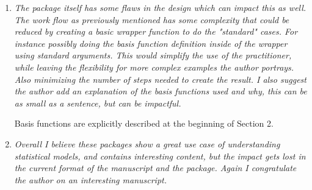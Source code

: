 \documentclass[12pt]{article}
\begin{document}
\begin{enumerate}
\item \textit{The package itself has some flaws in the design which can
impact this as well.  The work flow as previously mentioned has some
complexity that could be reduced by creating a basic wrapper function to do
the "standard" cases.  For instance possibly doing the basis function
definition inside of the wrapper using standard arguments.  This would
simplify the use of the practitioner, while leaving the flexibility for more
complex examples the author portrays.  Also minimizing the number of steps
needed to create the result.  I also suggest the author add an explanation
of the basis functions used and why, this can be as small as a sentence, but
can be impactful.  }

Basis functions are explicitly described at the beginning of Section 2.

\item \textit{Overall I believe these packages show a great use case of
understanding statistical models, and contains interesting content, but the
impact gets lost in the current format of the manuscript and the package. 
Again I congratulate the author on an interesting manuscript.}

\end{enumerate}
\end{document}
